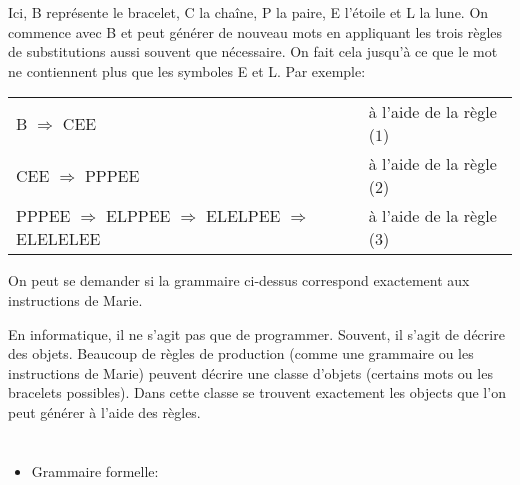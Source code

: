 {{Ici, B représente le bracelet, C la chaîne, P la paire, E l’étoile et L la lune. On commence avec B et peut générer de nouveau mots en appliquant les trois règles de substitutions aussi souvent que nécessaire. On fait cela jusqu’à ce que le mot ne contiennent plus que les symboles E et L. Par exemple:

\begin{adjustwidth}{1.5em}{0em}
\begin{tabular}{ @{} l l @{} }
  B \ensuremath{\Rightarrow} CEE & à l’aide de la règle ($1$) \\ 
  CEE \ensuremath{\Rightarrow} PPPEE & à l’aide de la règle ($2$) \\ 
  PPPEE \ensuremath{\Rightarrow} ELPPEE \ensuremath{\Rightarrow} ELELPEE \ensuremath{\Rightarrow} ELELELEE & à l’aide de la règle ($3$)
\end{tabular}


\end{adjustwidth}

On peut se demander si la grammaire ci-dessus correspond exactement aux instructions de Marie.

En informatique, il ne s’agit pas que de programmer. Souvent, il s’agit de décrire des objets. Beaucoup de règles de production (comme une grammaire ou les instructions de Marie) peuvent décrire une classe d’objets (certains mots ou les bracelets possibles). Dans cette classe se trouvent exactement les objects que l’on peut générer à l’aide des règles.



\section*{\BrochureWebsitesAndKeywords}
{\raggedright
\begin{itemize}
  \item Grammaire formelle: \href{https://fr.wikipedia.org/wiki/Grammaire_formelle}{}
\end{itemize}


}

}{}

\def\AuthorCoolsaetK{} %
\def\AuthorJovanovM{} %
\def\AuthorStankovE{} %
\def\AuthorRossmanithP{} %
\def\AuthorDatzkoS{} %
\def\AuthorFreiF{} %
\def\AuthorHromkovicJ{} %
\def\AuthorPelletE{} %

\newpage}{}
